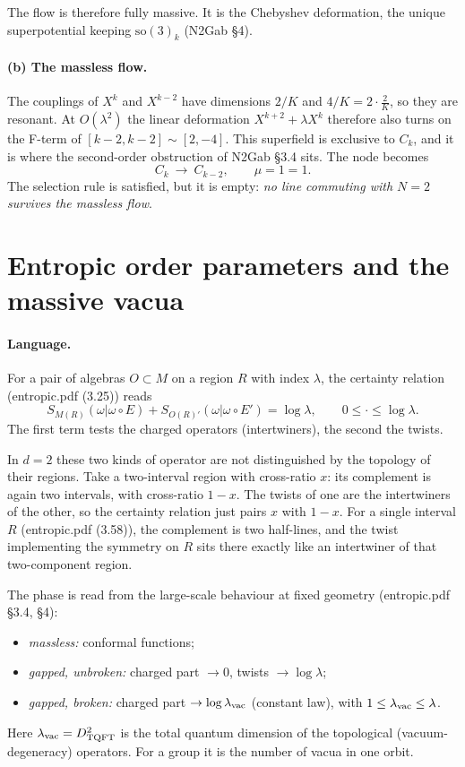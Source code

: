 \documentclass[11pt]{article}
\newcommand{\so}{\mathrm{so}(3)_k}
\begin{document}
The flow is therefore fully massive. It is the Chebyshev deformation, the unique superpotential keeping $\so$ (N2Gab \S4).

\paragraph{(b) The massless flow.} The couplings of $X^k$ and $X^{k-2}$ have dimensions $2/K$ and $4/K=2\cdot\frac2K$, so they are resonant. At $O(\lambda^2)$ the linear deformation $X^{k+2}+\lambda X^k$ therefore also turns on the F-term of $[k-2,k-2]\sim[2,-4]$. This superfield is exclusive to $C_k$, and it is where the second-order obstruction of N2Gab \S3.4 sits. The node becomes
\begin{equation}
C_k\ \longrightarrow\ C_{k-2},\qquad \mu=1=1 .
\end{equation}
The selection rule is satisfied, but it is empty: \emph{no line commuting with $N=2$ survives the massless flow}.

\section{Entropic order parameters and the massive vacua}

\paragraph{Language.} For a pair of algebras $O\subset M$ on a region $R$ with index $\lambda$, the certainty relation (entropic.pdf (3.25)) reads
\begin{equation}
S_{M(R)}(\omega|\omega\circ E)+S_{O(R)'}(\omega|\omega\circ E')=\log\lambda,\qquad 0\le\cdot\le\log\lambda .
\end{equation}
The first term tests the charged operators (intertwiners), the second the twists.

In $d=2$ these two kinds of operator are not distinguished by the topology of their regions. Take a two-interval region with cross-ratio $x$: its complement is again two intervals, with cross-ratio $1-x$. The twists of one are the intertwiners of the other, so the certainty relation just pairs $x$ with $1-x$. For a single interval $R$ (entropic.pdf (3.58)), the complement is two half-lines, and the twist implementing the symmetry on $R$ sits there exactly like an intertwiner of that two-component region.

The phase is read from the large-scale behaviour at fixed geometry (entropic.pdf \S3.4, \S4):
\begin{itemize}
\item \emph{massless:} conformal functions;
\item \emph{gapped, unbroken:} charged part $\to0$, twists $\to\log\lambda$;
\item \emph{gapped, broken:} charged part $\to\log\lambda_{\rm vac}$ (constant law), with $1\le\lambda_{\rm vac}\le\lambda$.
\end{itemize}
Here $\lambda_{\rm vac}=D^2_{\rm TQFT}$ is the total quantum dimension of the topological (vacuum-degeneracy) operators. For a group it is the number of vacua in one orbit.
\end{document}
